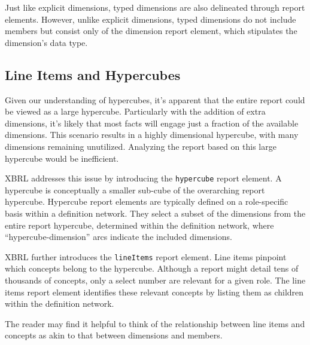 Just like explicit dimensions, typed dimensions are also delineated through report elements.
However, unlike explicit dimensions, typed dimensions do not include members but consist only of the dimension report element, which stipulates the dimension's data type.

\subsection{Line Items and Hypercubes}

Given our understanding of hypercubes, it's apparent that the entire report could be viewed as a large hypercube.
Particularly with the addition of extra dimensions, it's likely that most facts will engage just a fraction of the available dimensions.
This scenario results in a highly dimensional hypercube, with many dimensions remaining unutilized.
Analyzing the report based on this large hypercube would be inefficient.

XBRL addresses this issue by introducing the \texttt{hypercube} report element.
A hypercube is conceptually a smaller sub-cube of the overarching report hypercube.
Hypercube report elements are typically defined on a role-specific basis within a definition network.
They select a subset of the dimensions from the entire report hypercube,
determined within the definition network, where “hypercube-dimension” arcs indicate the included dimensions.

XBRL further introduces the \texttt{lineItems} report element.
Line items pinpoint which concepts belong to the hypercube.
Although a report might detail tens of thousands of concepts, only a select number are relevant for a given role.
The line items report element identifies these relevant concepts by listing them as children within the definition network.

The reader may find it helpful to think of the relationship between line items and concepts as akin to that between dimensions and members.



